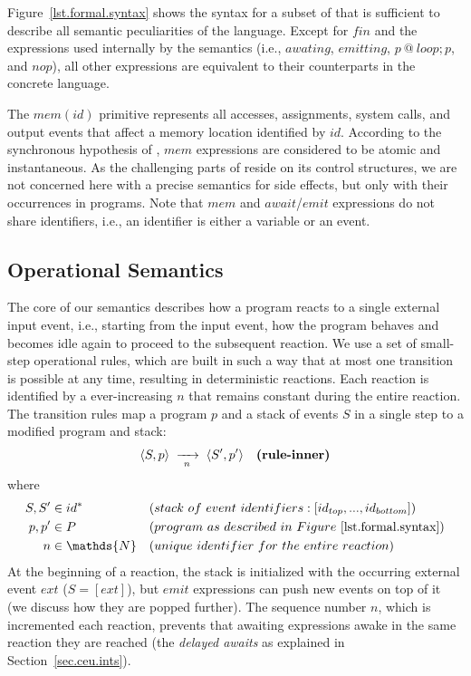 Figure~\ref{lst.formal.syntax} shows the syntax for a subset of \CEU that is 
sufficient to describe all semantic peculiarities of the language.
%
Except for $fin$ and the expressions used internally by the semantics (i.e., 
$awating$, $emitting$, $p~@~loop; p$, and $nop$), all other expressions are 
equivalent to their counterparts in the concrete language.

The $mem(id)$ primitive represents all accesses, assignments, system calls, and 
output events that affect a memory location identified by $id$.
%
According to the synchronous hypothesis of \CEU, $mem$ expressions are 
considered to be atomic and instantaneous.
%
As the challenging parts of \CEU reside on its control structures, we are not 
concerned here with a precise semantics for side effects, but only with their 
occurrences in programs.
%
%
Note that $mem$ and $await$/$emit$ expressions do not share identifiers, i.e., 
an identifier is either a variable or an event.

\subsection{Operational Semantics}

The core of our semantics describes how a program reacts to a single external 
input event, i.e., starting from the input event, how the program behaves and 
becomes idle again to proceed to the subsequent reaction.
%
We use a set of small-step operational rules, which are built in such a way 
that at most one transition is possible at any time, resulting in deterministic 
reactions.
%
Each reaction is identified by a ever-increasing $n$ that remains constant 
during the entire reaction.
The transition rules map a program $p$ and a stack of events $S$ in a single 
step to a modified program and stack:
%
\begin{align*}
\langle S, p \rangle &\;\xrightarrow[~n~]{}\;
\langle S', p' \rangle
    & \textbf{(rule-inner)}
\end{align*}
%
where
%
\begin{align*}
S, S' &\in id^*
    &&(stack~of~event~identifiers: [id_{top}, ..., id_{bottom}]) \\
p, p' &\in P
    && (program~as~described~in~Figure~\ref{lst.formal.syntax}) \\
n     &\in \mathds{N}
    && (unique~identifier~for~the~entire~reaction)
\end{align*}
%
At the beginning of a reaction, the stack is initialized with the occurring 
external event $ext$ ($S=[ext]$), but $emit$ expressions can push new events on 
top of it (we discuss how they are popped further).
The sequence number $n$, which is incremented each reaction, prevents that 
awaiting expressions awake in the same reaction they are reached (the 
\emph{delayed awaits} as explained in Section~\ref{sec.ceu.ints}).

